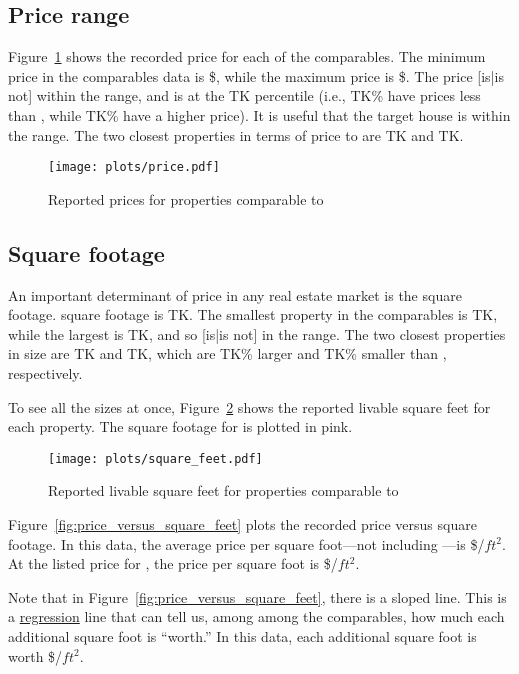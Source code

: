 \documentclass[
10pt, %
a4paper, %
oneside, %
headinclude,footinclude, %
BCOR5mm, %
]{scrartcl}
\begin{document}
\subsection{Price range} 
Figure~\ref{fig:price} shows the recorded price for each of the comparables.
The minimum price in the comparables data is \$\MinPrice{}, while the maximum price is \$\MaxPrice{}.
The \PropertyName{} price [is|is not] within the range, and is at the TK percentile (i.e., TK\% have prices less than \PropertyName{}, while TK\% have a higher price).
It is useful that the target house is within the range.
The two closest properties in terms of price to \PropertyName{} are TK and TK. 

\begin{figure}
\centering
\caption{Reported prices for properties comparable to \PropertyName{}} \label{fig:price}  
\texttt{[image: plots/price.pdf]} 
\end{figure}

\subsection{Square footage}
An important determinant of price in any real estate market is the square footage.
\PropertyName{} square footage is TK.
The smallest property in the comparables is TK, while the largest is TK, and so \PropertyName{} [is|is not] in the range. 
The two closest properties in size are TK and TK, which are TK\% larger and TK\% smaller than \PropertyName{}, respectively.

To see all the sizes at once, Figure~\ref{fig:square_feet} shows the reported livable square feet for each property.
The square footage for \PropertyName{} is plotted in pink. 

\begin{figure}
\centering
\caption{Reported livable square feet for properties comparable to \PropertyName{}} \label{fig:square_feet}  
\texttt{[image: plots/square\_feet.pdf]} 
\end{figure}

Figure~\ref{fig:price_versus_square_feet} plots the recorded price versus square footage.
In this data, the average price per square foot---not including \PropertyName{}---is \$\MeanPricePerFoot{}/$ft^2$.
At the listed price for \PropertyName{}, the price per square foot is \$\MeanPricePerFootFocal{}/$ft^2$.

Note that in Figure~\ref{fig:price_versus_square_feet}, there is a sloped line.
This is a \href{https://en.wikipedia.org/wiki/Linear_regression}{regression} line that can tell us, among among the comparables, how much each additional square foot is ``worth.''
In this data, each additional square foot is worth \$\MarginalPricePerFoot{}/$ft^2$. 
\end{document}
